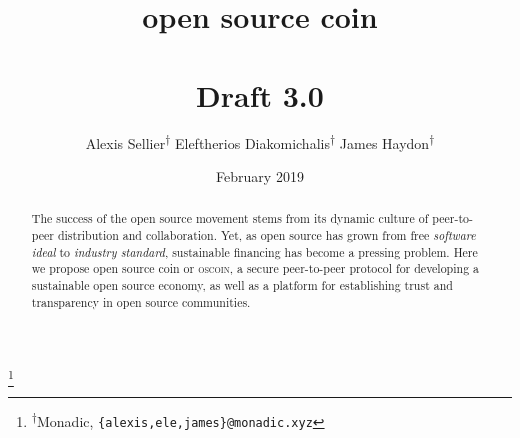 \documentclass[a4paper, oneside, 10pt, final]{amsart}
\begin{document}
\title[open source coin]{open source coin \\ \vspace{0.5em} \\ {\tiny Draft 3.0}}
\author{\Small Alexis Sellier\textsuperscript{$\dagger$} \qquad Eleftherios Diakomichalis\textsuperscript{$\dagger$} \qquad James Haydon\textsuperscript{$\dagger$}}
\date{February 2019}

\thanks{\textsuperscript{$\dagger$}Monadic, \texttt{\{alexis,ele,james\}@monadic.xyz}}

\begin{abstract}
The success of the open source movement stems from its dynamic culture of
peer-to-peer distribution and collaboration. Yet, as open source has grown from
free \emph{software ideal} to \emph{industry standard}, sustainable financing
has become a pressing problem.  Here we propose open source coin or
\textsc{oscoin}, a secure peer-to-peer protocol for developing a sustainable
open source economy, as well as a platform for establishing trust and
transparency in open source communities.
\end{abstract}

\maketitle
\end{document}
